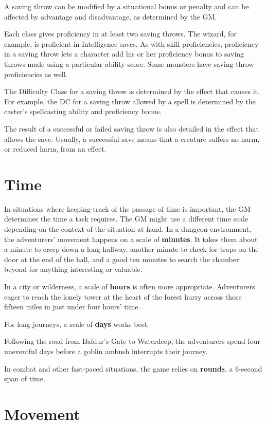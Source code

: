 A saving throw can be modified by a situational bonus or penalty and can be affected by advantage and disadvantage, as determined by the GM.

Each class gives proficiency in at least two saving throws. The wizard, for example, is proficient in Intelligence saves. As with skill proficiencies, proficiency in a saving throw lets a character add his or her proficiency bonus to saving throws made using a particular ability score. Some monsters have saving throw proficiencies as well.

The Difficulty Class for a saving throw is determined by the effect that causes it. For example, the DC for a saving throw allowed by a spell is determined by the caster's spellcasting ability and proficiency bonus.

The result of a successful or failed saving throw is also detailed in the effect that allows the save. Usually, a successful save means that a creature suffers no harm, or reduced harm, from an effect.

\section{Time}

In situations where keeping track of the passage of time is important, the GM determines the time a task requires. The GM might use a different time scale depending on the context of the situation at hand. In a dungeon environment, the adventurers' movement happens on a scale of \textbf{minutes}. It takes them about a minute to creep down a long hallway, another minute to check for traps on the door at the end of the hall, and a good ten minutes to search the chamber beyond for anything interesting or valuable.

In a city or wilderness, a scale of \textbf{hours} is often more appropriate. Adventurers eager to reach the lonely tower at the heart of the forest hurry across those fifteen miles in just under four hours' time.

For long journeys, a scale of \textbf{days} works best.

Following the road from Baldur's Gate to Waterdeep, the adventurers spend four uneventful days before a goblin ambush interrupts their journey.

In combat and other fast-paced situations, the game relies on \textbf{rounds}, a 6-second span of time.

\section{Movement}

